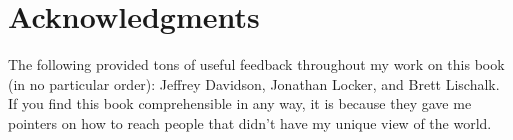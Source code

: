 \chapter{Acknowledgments}
The following provided tons of useful feedback throughout my work on this book (in no particular order):
Jeffrey Davidson, Jonathan Locker, and Brett Lischalk. If you find this book comprehensible in any way,
it is because they gave me pointers on how to reach people that didn't have my unique view of the world.


